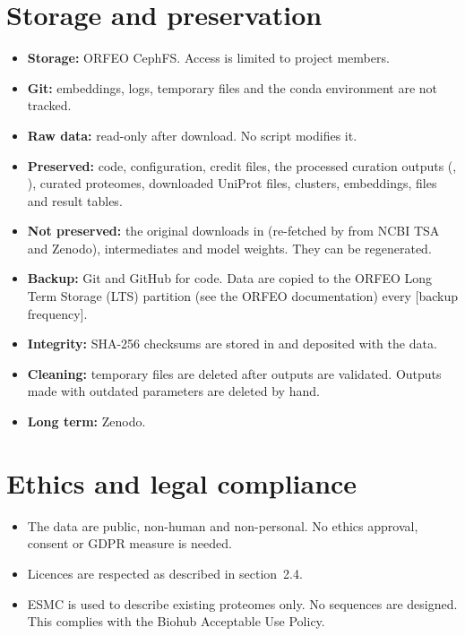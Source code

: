 \documentclass[11pt,a4paper]{article}
\newcommand{\tbd}[1]{\textcolor{BrickRed}{[#1]}}
\begin{document}
\section{Storage and preservation}

\begin{itemize}
\item \textbf{Storage:} ORFEO CephFS. Access is limited to project members.
\item \textbf{Git:} embeddings, logs, temporary files and the conda environment are not tracked.
\item \textbf{Raw data:} read-only after download. No script modifies it.
\item \textbf{Preserved:} code, configuration, credit files, the processed curation outputs (, ), curated proteomes, downloaded UniProt files, clusters, embeddings,  files and result tables.
\item \textbf{Not preserved:} the original downloads in  (re-fetched by  from NCBI TSA and Zenodo), intermediates and model weights. They can be regenerated.
\item \textbf{Backup:} Git and GitHub for code. Data are copied to the ORFEO Long Term Storage (LTS) partition (see the ORFEO documentation) every \tbd{backup frequency}.
\item \textbf{Integrity:} SHA-256 checksums are stored in  and deposited with the data.
\item \textbf{Cleaning:} temporary files are deleted after outputs are validated. Outputs made with outdated parameters are deleted by hand.
\item \textbf{Long term:} Zenodo.
\end{itemize}

\section{Ethics and legal compliance}

\begin{itemize}
\item The data are public, non-human and non-personal. No ethics approval, consent or GDPR measure is needed.
\item Licences are respected as described in section~2.4.
\item ESMC is used to describe existing proteomes only. No sequences are designed. This complies with the Biohub Acceptable Use Policy.
\end{itemize}
\end{document}
